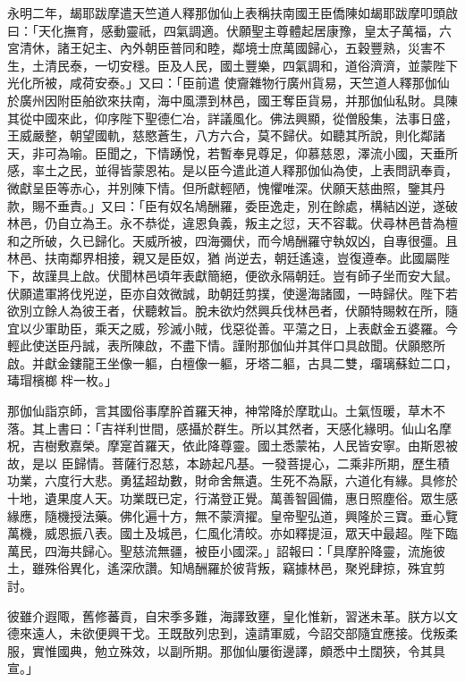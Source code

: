 \begin{pinyinscope}
 永明二年，朅耶跋摩遣天竺道人釋那伽仙上表稱扶南國王臣僑陳如朅耶跋摩叩頭啟曰：「天化撫育，感動靈祇，四氣調適。伏願聖主尊體起居康豫，皇太子萬福，六宮清休，諸王妃主、內外朝臣普同和睦，鄰境士庶萬國歸心，五穀豐熟，災害不生，土清民泰，一切安穩。臣及人民，國土豐樂，四氣調和，道俗濟濟，並蒙陛下光化所被，咸荷安泰。」又曰：「臣前遣
 使齎雜物行廣州貨易，天竺道人釋那伽仙於廣州因附臣舶欲來扶南，海中風漂到林邑，國王奪臣貨易，并那伽仙私財。具陳其從中國來此，仰序陛下聖德仁冶，詳議風化。佛法興顯，從僧殷集，法事日盛，王威嚴整，朝望國軌，慈愍蒼生，八方六合，莫不歸伏。如聽其所說，則化鄰諸天，非可為喻。臣聞之，下情踴悅，若暫奉見尊足，仰慕慈恩，澤流小國，天垂所感，率土之民，並得皆蒙恩祐。是以臣今遣此道人釋那伽仙為使，上表問訊奉貢，微獻呈臣等赤心，并別陳下情。但所獻輕陋，愧懼唯深。伏願天慈曲照，鑒其丹款，賜不垂責。」又曰：「臣有奴名鳩酬羅，委臣逸走，別在餘處，構結凶逆，遂破林邑，仍自立為王。永不恭從，違恩負義，叛主之愆，天不容載。伏尋林邑昔為檀和之所破，久已歸化。天威所被，四海彌伏，而今鳩酬羅守執奴凶，自專很彊。且林邑、扶南鄰界相接，親又是臣奴，猶
 尚逆去，朝廷遙遠，豈復遵奉。此國屬陛下，故謹具上啟。伏聞林邑頃年表獻簡絕，便欲永隔朝廷。豈有師子坐而安大鼠。伏願遣軍將伐兇逆，臣亦自效微誠，助朝廷剪撲，使邊海諸國，一時歸伏。陛下若欲別立餘人為彼王者，伏聽敕旨。脫未欲灼然興兵伐林邑者，伏願特賜敕在所，隨宜以少軍助臣，乘天之威，殄滅小賊，伐惡從善。平蕩之日，上表獻金五婆羅。今輕此使送臣丹誠，表所陳啟，不盡下情。謹附那伽仙并其伴口具啟聞。伏願愍所啟。并獻金鏤龍王坐像一軀，白檀像一軀，牙塔二軀，古具二雙，璢璃蘇鉝二口，瑇瑁檳榔柈一枚。」



 那伽仙詣京師，言其國俗事摩肸首羅天神，神常降於摩耽山。土氣恆暖，草木不落。其上書曰：「吉祥利世間，感攝於群生。所以其然者，天感化緣明。仙山名摩柷，吉樹敷嘉榮。摩寔首羅天，依此降尊靈。國土悉蒙祐，人民皆安寧。由斯恩被故，是以
 臣歸情。菩薩行忍慈，本跡起凡基。一發菩提心，二乘非所期，歷生積功業，六度行大悲。勇猛超劫數，財命舍無遺。生死不為厭，六道化有緣。具修於十地，遺果度人天。功業既已定，行滿登正覺。萬善智圓備，惠日照塵俗。眾生感緣應，隨機授法藥。佛化遍十方，無不蒙濟擢。皇帝聖弘道，興隆於三寶。垂心覽萬機，威恩振八表。國土及城邑，仁風化清皎。亦如釋提洹，眾天中最超。陛下臨萬民，四海共歸心。聖慈流無疆，被臣小國深。」詔報曰：「具摩肸降靈，流施彼土，雖殊俗異化，遙深欣讚。知鳩酬羅於彼背叛，竊據林邑，聚兇肆掠，殊宜剪討。



 彼雖介遐陬，舊修蕃貢，自宋季多難，海譯致壅，皇化惟新，習迷未革。朕方以文德來遠人，未欲便興干戈。王既敔列忠到，遠請軍威，今詔交部隨宜應接。伐叛柔服，實惟國典，勉立殊效，以副所期。那伽仙屢銜邊譯，頗悉中土闊狹，令其具宣。」




\end{pinyinscope}
